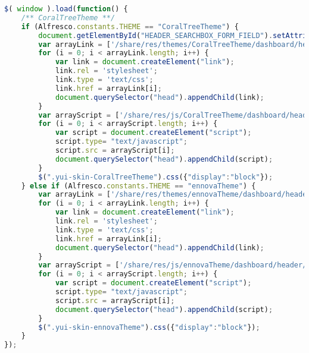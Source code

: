 \begin{lstlisting}[language=JavaScript, caption=codice di layout.js, label=code-layout]
$( window ).load(function() {
    /** CoralTreeTheme **/
    if (Alfresco.constants.THEME == "CoralTreeTheme") {
        document.getElementById("HEADER_SEARCHBOX_FORM_FIELD").setAttribute("placeholder","Chi cerca, trova!");
        var arrayLink = ['/share/res/themes/CoralTreeTheme/dashboard/header/header.css', '/share/res/themes/CoralTreeTheme/dashboard/footer/footer.css'];
        for (i = 0; i < arrayLink.length; i++) {
            var link = document.createElement("link");
            link.rel = 'stylesheet';
            link.type = 'text/css';
            link.href = arrayLink[i];
            document.querySelector("head").appendChild(link);
        }
        var arrayScript = ['/share/res/js/CoralTreeTheme/dashboard/header/header.js', '/share/res/js/CoralTreeTheme/dashboard/footer/footer.js'];
        for (i = 0; i < arrayScript.length; i++) {
            var script = document.createElement("script");
            script.type= "text/javascript";
            script.src = arrayScript[i];
            document.querySelector("head").appendChild(script);
        }
        $(".yui-skin-CoralTreeTheme").css({"display":"block"});
    } else if (Alfresco.constants.THEME == "ennovaTheme") {
        var arrayLink = ['/share/res/themes/ennovaTheme/dashboard/header/header.css', '/share/res/themes/ennovaTheme/dashboard/footer/footer.css'];
        for (i = 0; i < arrayLink.length; i++) {
            var link = document.createElement("link");
            link.rel = 'stylesheet';
            link.type = 'text/css';
            link.href = arrayLink[i];
            document.querySelector("head").appendChild(link);
        }
        var arrayScript = ['/share/res/js/ennovaTheme/dashboard/header/header.js', '/share/res/js/ennovaTheme/dashboard/footer/footer.js'];
        for (i = 0; i < arrayScript.length; i++) {
            var script = document.createElement("script");
            script.type= "text/javascript";
            script.src = arrayScript[i];
            document.querySelector("head").appendChild(script);
        }
        $(".yui-skin-ennovaTheme").css({"display":"block"});
    }
});
\end{lstlisting}
